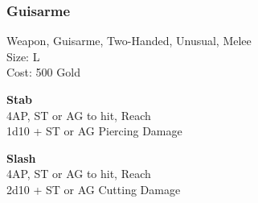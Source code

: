 \subsubsection{Guisarme}\label{weapon:guisarme}
Weapon, Guisarme, Two-Handed, Unusual, Melee\\
Size: L\\
Cost: 500 Gold

\textbf{Stab}\\
4AP, ST or AG to hit,  Reach\\
1d10 + \texttimes ST or AG Piercing Damage

\textbf{Slash}\\
4AP, ST or AG to hit,  Reach\\
2d10 + \texttimes ST or AG Cutting Damage
